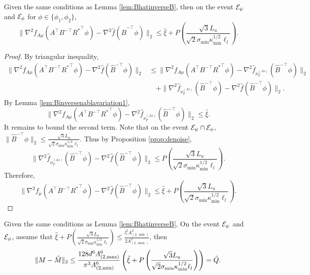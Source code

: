\begin{lemma}
\label{lem:Binversenablavariation2}
Given the same conditions as Lemma \ref{lem:BhatinverseB}, then on the event $\mathcal{E}_{\psi}$ and $\mathcal{E}_{\phi}$ for $\phi \in \{\phi_1, \phi_2\}$,
\[
\|\nabla^2 f_{A\mu}(A^{\top}B^{-\top}{R^*}^{\top}\phi) - \nabla^2 \widehat{f}(\hat{B}^{-\top}\phi)  \|_2 
\le
 \hat{\xi}
+
P\left(\frac{\sqrt{3}L_u}{\sqrt{2}\sigma_{\min}\kappa_{\min}^{1/2}\ell_l}\right).
\]
\end{lemma}
\begin{proof}
By triangular inequality, 
\begin{align*}
\|\nabla^2 f_{A\mu}(A^{\top}B^{-\top}{R^*}^{\top}\phi) - \nabla^2 \hat{f}(\hat{B}^{-\top}\phi)  \|_2 
& \le 
\|\nabla^2 f_{A\mu}(A^{\top}B^{-\top}{R^*}^{\top}\phi) - \nabla^2 \widehat{f}_{\nu_T^{(As)}}(\hat{B}^{-\top}\phi)  \|_2 \\
& \quad +
\|\nabla^2 \widehat{f}_{\nu_T^{(As)}}(\hat{B}^{-\top}\phi) - \nabla^2 \widehat{f}(\hat{B}^{-\top}\phi)  \|_2. 
\end{align*}
By Lemma \ref{lem:Binversenablavariation1}, 
\[
\|\nabla^2 f_{A\mu}(A^{\top}B^{-\top}{R^*}^{\top}\phi) - \nabla^2 \widehat{f}_{\nu_T^{(As)}}(\hat{B}^{-\top}\phi)  \|_2 
\le \hat{\xi}. 
\]
It remains to bound the second term. 
Note that on the event $\mathcal{E}_{\psi}\cap\mathcal{E}_{\phi}$, $\|\hat{B}^{-\top}\phi\|_2 \le \frac{\sqrt{3}L_u}{\sqrt{2}\sigma_{\min}\kappa_{\min}^{1/2}\ell_l}$. 
Thus by Proposition \ref{prop:denoise}, 
\[
\|\nabla^2 \widehat{f}_{\nu_T^{(As)}}(\hat{B}^{-\top}\phi) - \nabla^2 \widehat{f}(\hat{B}^{-\top}\phi)  \|_2 \le P\left(\frac{\sqrt{3}L_u}{\sqrt{2}\sigma_{\min}\kappa_{\min}^{1/2}\ell_l}\right).
\]
Therefore, 
\[
\|\nabla^2 f_{\mu}(A^{\top}B^{-\top}{R^*}^{\top}\phi) - \nabla^2 \hat{f}(\hat{B}^{-\top}\phi)  \|_2 
\le 
 \hat{\xi}
+
P\left(\frac{\sqrt{3}L_u}{\sqrt{2}\sigma_{\min}\kappa_{\min}^{1/2}\ell_l}\right).
\]
\end{proof}
\begin{lemma}
\label{lem:Tvariantion}
Given the same conditions as Lemma \ref{lem:BhatinverseB}, On the event $\mathcal{E}_{\psi}$ and $\mathcal{E}_{\phi}$, assume that $\hat{\xi}
+
P\left(\frac{\sqrt{3}L_u}{\sqrt{2}\sigma_{\min}\kappa_{\min}^{1/2}\ell_l}\right)\le \frac{l_l^2 A^2_{(2,\min)}}{2A^2_{(2,\max)}}$, then 
\[
\|M - \hat{M}\|_2 \le  \frac{128d^6A^6_{(2,\max)}}{\pi^3 A^6_{(2,\min)}}\left(\hat{\xi}+
P\left(\frac{\sqrt{3}L_u}{\sqrt{2}\sigma_{\min}\kappa_{\min}^{1/2}\ell_l}\right)\right) = \tilde{Q}.
\]
\end{lemma}

